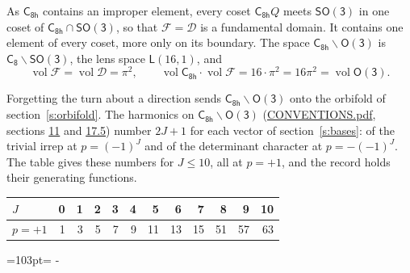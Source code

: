 \documentclass[10pt,a4paper]{article}
\newcommand{\needspace}[1]{\par\penalty-100\begingroup\dimen0=#1\relax\dimen2=\pagegoal
  \advance\dimen2-\pagetotal\ifdim\dimen0>\dimen2\relax\ifdim\dimen2>0pt\vfil\break\fi\fi
  \endgroup}
\numberwithin{equation}{section}
\newcommand{\grp}[1]{\mathsf{#1}}
\newcommand{\vol}{\operatorname{vol}}
\newcommand{\fcell}{\mathcal{D}}
\newcommand{\fdomain}{\mathcal{F}}
\newcommand{\lensspace}[2]{\mathsf{L}(#1, #2)}
\begin{document}
\leavevmode\label{n:set.fundamental}As $\grp{C_{8h}}$ contains an improper element, every coset $\grp{C_{8h}}Q$ meets \href{SO3.pdf}{$\grp{SO(3)}$} in one coset of $\grp{C_{8h}} \cap \grp{SO(3)}$, so that $\fdomain = \fcell$ is a fundamental domain. It contains one element of every coset, more only on its boundary.
\leavevmode\label{n:set.lens}The space $\grp{C_{8h}}\backslash\grp{O(3)}$ is $\grp{C_{8}}\backslash\grp{SO(3)}$, the lens space $\lensspace{16}{1}$, and
\begin{equation}\label{e:volume}\vol\fdomain = \vol\fcell = \pi^2,\qquad \vol\grp{C_{8h}}\cdot\vol\fdomain = 16\cdot \pi^2 = 16\pi^2 = \vol\grp{O(3)}.\end{equation}

Forgetting the turn about a direction sends $\grp{C_{8h}}\backslash\grp{O(3)}$ onto the orbifold of section~\ref{s:orbifold}.
The harmonics on $\grp{C_{8h}}\backslash\grp{O(3)}$ (\href{../../CONVENTIONS.pdf}{CONVENTIONS.pdf}, sections \href{../../CONVENTIONS.pdf\#conv.11}{11} and \href{../../CONVENTIONS.pdf\#conv.17.5}{17.5}) number $2J + 1$ for each vector of section~\ref{s:bases}: of the trivial irrep at $p = (-1)^J$ and of the determinant character at $p = -(-1)^J$. The table gives these numbers for $J \le 10$, all at $p = +1$, and the record holds their generating functions.
{\small\setlength{\tabcolsep}{4pt}\begin{longtable}{@{}lrrrrrrrrrrr@{}}\toprule
$J$ & 0 & 1 & 2 & 3 & 4 & 5 & 6 & 7 & 8 & 9 & 10\\\midrule\endhead
\bottomrule\endfoot\endlastfoot
$p = +1$ & 1 & 3 & 5 & 7 & 9 & 11 & 13 & 15 & 51 & 57 & 63\\
\bottomrule\end{longtable}}
\needspace{103pt}
\end{document}
